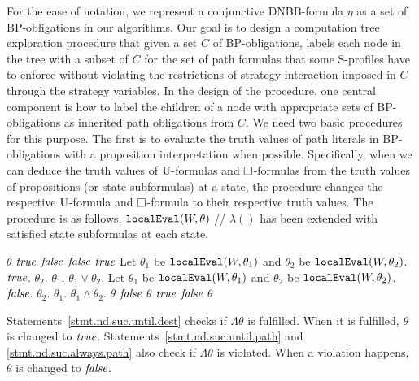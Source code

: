 For the ease of notation, we represent 
a conjunctive DNBB-formula $\eta$ as a set of BP-obligations in our algorithms.  
Our goal is to design a computation tree exploration procedure
that given a set $C$ of BP-obligations, 
labels each node in the tree with a subset of $C$
for the set of path formulas that some S-profiles
have to enforce without violating the restrictions of strategy
interaction imposed in $C$ through the strategy variables.
In the design of the procedure, one central component is
how to label the children of a node with appropriate sets of BP-obligations 
as inherited path obligations from $C$. 
We need two basic procedures for this purpose. 
The first is to evaluate the truth values of path literals in 
BP-obligations with a proposition interpretation when possible. 
Specifically, when we can deduce the truth values of 
$\textrm{U}$-formulas and $\Box$-formulas from the truth values of propositions (or state subformulas) at a state, 
the procedure changes the respective $\textrm{U}$-formula and $\Box$-formula to their  respective truth values. 
The procedure is as follows. 
\procbegin 
$\mbox{\tt localEval}(W,\theta)$ // $\lambda()$ has been extended with 
			satisfied state subformulas at each state. 
\begin{algorithmic}[1]
\SWITCH {$\theta$} 
  \RETLINE $\theta$
   \RETLINE $\mbox{\em true}$ 
  \ELSELINE \RETLINE $\mbox{\em false}$ 
  \ENDIFLINE   
{} 
   \RETLINE $\mbox{\em false}$ 
  \ELSELINE \RETLINE $\mbox{\em true}$  
  \ENDIFLINE   
{} 
  \STATE Let $\theta_1$ be $\mbox{\tt localEval}(W,\theta_1)$ and 
    $\theta_2$ be $\mbox{\tt localEval}(W,\theta_2)$. 
    \RETLINE $\mbox{\em true}$. 
    \RETLINE $\theta_2$. 
    \RETLINE $\theta_1$. 
  \ELSELINE 
    \RETLINE $\theta_1\vee\theta_2$. 
  \ENDIFNLINE 
\ENDCASE
{} 
  \STATE Let $\theta_1$ be $\mbox{\tt localEval}(W,\theta_1)$ and 
    $\theta_2$ be $\mbox{\tt localEval}(W,\theta_2)$. 
    \RETLINE $\mbox{\em false}$. 
    \RETLINE $\theta_2$. 
    \RETLINE $\theta_1$. 
  \ELSELINE 
    \RETLINE $\theta_1\wedge\theta_2$. 
  \ENDIFNLINE  
\ENDCASE 
{} 
  \RETLINE $\theta$
 \label{stmt.nd.suc.always.path}
    \RETLINE $\mbox{\em false}$ 
  \ELSELINE 
    \RETLINE $\theta$
  \ENDIFLINE 
{} 
   \label{stmt.nd.suc.until.dest}
    \RETLINE $\mbox{\em true}$
  \label{stmt.nd.suc.until.path}
    \RETLINE $\mbox{\em false}$
  \ELSELINE
    \RETLINE $\theta$
  \ENDIFLINE 
\ENDSWITCH 
\end{algorithmic}
\procend 
Statements~\ref{stmt.nd.suc.until.dest} 
checks if $\Lambda\theta$ is fulfilled.
When it is fulfilled, 
$\theta$ is changed to $\mbox{\em true}$.   
Statements~\ref{stmt.nd.suc.until.path} 
and \ref{stmt.nd.suc.always.path} also 
check if $\Lambda\theta$ is violated.
When a violation happens, 
$\theta$ is changed to $\mbox{\em false}$.   

